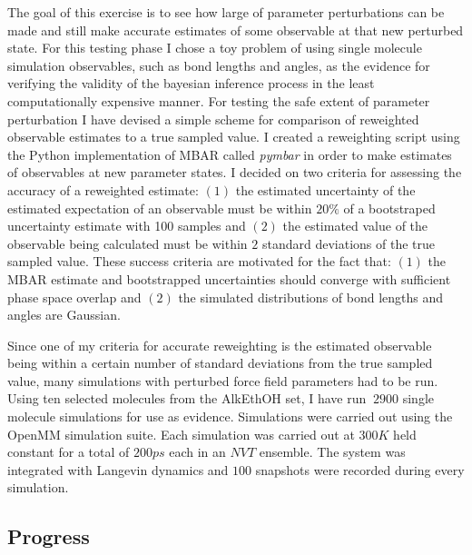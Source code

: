 \documentclass[rmp,nofootinbib,superscriptaddress,12pt,tightenlines,notitlepage]{revtex4-1}
\begin{document}
The goal of this exercise is to see how large of parameter perturbations can be made and still make accurate estimates of some observable at that new perturbed state. For this testing phase I chose a toy problem of using single molecule simulation observables, such as bond lengths and angles, as the evidence for verifying the validity of the bayesian inference process in the least computationally expensive manner. For testing the safe extent of parameter perturbation I have devised a simple scheme for comparison of reweighted observable estimates to a true sampled value. I created a reweighting script using the Python implementation
of MBAR called \textit{pymbar} in order to make estimates of observables at new parameter states. I decided on two criteria for assessing the accuracy
of a reweighted estimate: $\left(1\right)$ the estimated uncertainty of the estimated expectation of an observable must be within $20 \%$ of a bootstraped uncertainty estimate with 100 samples and $\left(2\right)$ the estimated value of the observable being calculated must be within $2$ standard deviations of the true
sampled value. These success criteria are motivated for the fact that: $\left(1\right)$ the MBAR estimate and bootstrapped uncertainties should converge with 
sufficient phase space overlap and $\left(2\right)$ the simulated distributions of bond lengths and angles are Gaussian. 

Since one of my criteria for accurate reweighting is the estimated observable being within a certain number of standard deviations from the true sampled value, many simulations with perturbed force field parameters had to be run. Using ten selected molecules from the AlkEthOH set, I have run $~2900$
single molecule simulations for use as evidence. Simulations were carried out using the OpenMM simulation suite. Each simulation was carried out at 
$300 K$ held constant for a total of $200 ps$ each in an $NVT$ ensemble. The system was integrated with Langevin dynamics and $100$ snapshots were recorded 
during every simulation.

\subsection{Progress}
\end{document}
